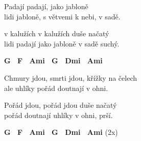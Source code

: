 
\ve{}
Padají padají, jako jabloně\\
lidi jabloně, s větvemi k nebi, v sadě.

\ve{}
v kalužích v kalužích duše načatý\\
lidi padají jako jabloně v sadě suchý.

\textbf{{\footnotesize G \ F \ Ami \ G \ Dmi \ Ami}}

\ve{}
Chmury jdou, smrti jdou, křížky na čelech\\
ale uhlíky pořád doutnají v ohni.

\ve{}
Pořád jdou, pořád jdou duše načatý\\
pořád doutnají uhlíky v ohni, prší.

\footnotesize{\textbf{G \ F \ Ami \ G \ Dmi \ Ami} (2x)}

\esong{}